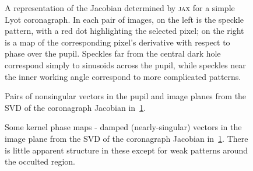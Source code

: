 \documentclass[modern]{aastex63}
\begin{document}
\begin{figure}
\caption{A representation of the Jacobian determined by \textsc{jax} for a simple Lyot coronagraph. In each pair of images, on the left is the speckle pattern, with a red dot highlighting the selected pixel; on the right is a map of the corresponding pixel's derivative with respect to phase over the pupil. Speckles far from the central dark hole correspond simply to sinusoids across the pupil, while speckles near the inner working angle correspond to more complicated patterns. \label{speckle_jacobian}}
\end{figure}


\begin{figure}
\caption{Pairs of nonsingular vectors in the pupil and image planes from the SVD of the coronagraph Jacobian in~\ref{speckle_jacobian}.
\label{nonsingular_corona}} 
\end{figure}

\begin{figure}
\caption{Some kernel phase maps - damped (nearly-singular) vectors in the image plane from the SVD of the coronagraph Jacobian in~\ref{speckle_jacobian}. There is little apparent structure in these except for weak patterns around the occulted region.
\label{kernel_corona}}
\end{figure}



\end{document}
